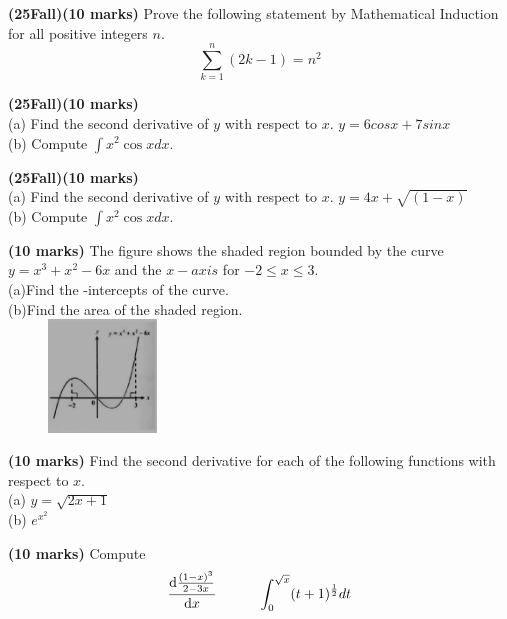 \documentclass{article}
\begin{document}
\vspace{3\baselineskip}

\noindent \textbf{(25Fall)(10 marks)} Prove the following statement by Mathematical Induction for all positive integers $n$.
$$ \sum_{k=1}^{n}(2 k-1)=n^{2} $$

\vspace{3\baselineskip}


\noindent \textbf{(25Fall)(10 marks)} \\
(a) Find the second derivative of $y$ with respect to $x$. \indent $y = 6cosx + 7sinx$ \\
(b) Compute \indent  $\int x^{2} \cos x d x$.

\vspace{3\baselineskip}

\noindent \textbf{(25Fall)(10 marks)} \\
(a) Find the second derivative of $y$ with respect to $x$. \indent $y = 4x + \sqrt{(1-x)}$ \\
(b) Compute \indent  $\int x^{2} \cos x d x$.

\vspace{3\baselineskip}

\noindent \textbf{(10 marks)} The figure shows the shaded region bounded by the curve $y=x^3+x^2-6x$ and the $x-axis$ for $-2 \le x \le 3$.\\
\indent (a)Find the -intercepts of the curve.\\
\indent (b)Find the area of the shaded region.\\ 

\hfill
\includegraphics[width=5cm, height=3cm]{graph1.jpg}

\vspace{3\baselineskip}

\noindent \textbf{(10 marks)} Find the second derivative for each of the following functions with respect to $x$.\\
\indent (a) $y=\sqrt{2x+1}$\\
\indent (b) $e^{x^2}$

\vspace{3\baselineskip}

\noindent \textbf{(10 marks)} Compute \indent $$\frac{\mathrm{d} \frac{(1-x)^3}{2-3x} }{\mathrm{d} x} \indent \indent \int_{0}^{\sqrt{x}}(t+1)^\frac{1}{2} dt $$
\end{document}
